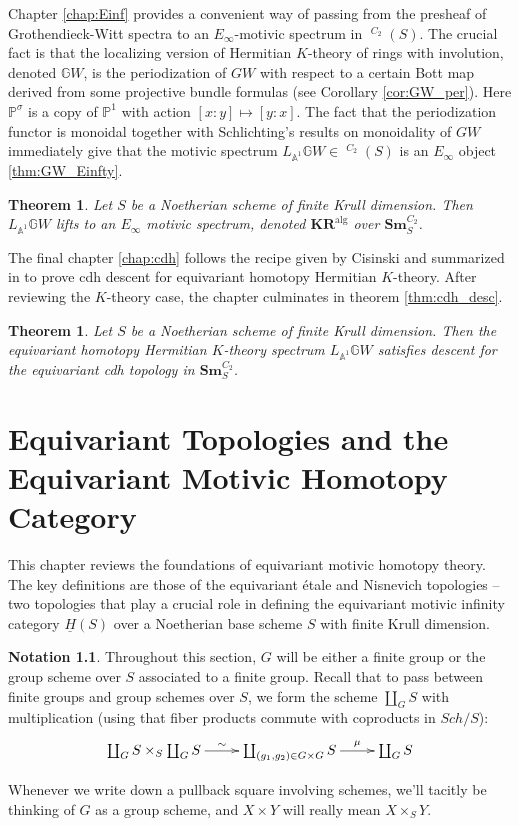 \documentclass[edeposit,fullpage]{uiucthesis2009}
\newcommand{\mbb}{\mathbb}
\newcommand{\Sm}[1]{\mathbf{Sm}_{#1}}
\newcommand{\KR}{\mathbf{KR}^{\mathrm{alg}}}
\DeclareMathOperator{\SH}{\underline{SH}}
\theoremstyle{plain}
\numberwithin{lemma}{section}
\newtheorem{theorem}[lemma]{Theorem}
\theoremstyle{definition}
\newtheorem{notation}[lemma]{Notation}
\begin{document}
Chapter \ref{chap:Einf} provides a convenient way of passing from the
presheaf of Grothendieck-Witt spectra to an
$E_\infty$-motivic spectrum in $\SH^{C_2}(S)$. The crucial fact is that
the localizing version of Hermitian $K$-theory of rings with involution, denoted $\mbb
GW$, is the periodization of $GW$ with respect to a certain Bott map
derived from some projective bundle formulas (see Corollary \ref{cor:GW_per}). Here
$\mbb P^\sigma$ is a copy of $\mbb P^1$ with action $[x:y] \mapsto
[y:x]$. The fact that the periodization functor is monoidal together
with Schlichting's results on monoidality of $GW$ immediately give
that the motivic spectrum $L_{\mbb A^1}\mbb GW \in \SH^{C_2}(S)$ is an
$E_\infty$ object \ref{thm:GW_Einfty}.

\begin{theorem}
Let $S$ be a Noetherian scheme of finite Krull dimension. Then $L_{\mbb A^1}\mbb GW$ lifts to an $E_\infty$ motivic spectrum, denoted
$\KR$ over $\Sm{S}^{C_2}$.
\end{theorem}

The final chapter \ref{chap:cdh} follows the recipe given by Cisinski
and summarized in \cite{cdhdesc} to prove cdh descent for equivariant
homotopy Hermitian $K$-theory. After reviewing the $K$-theory case,
the chapter culminates in theorem \ref{thm:cdh_desc}.

\begin{theorem}
Let $S$ be a Noetherian scheme of finite Krull dimension. Then the
equivariant homotopy Hermitian $K$-theory spectrum $L_{\mbb A^1}\mbb
GW$ satisfies descent for the equivariant cdh topology in $\Sm{S}^{C_2}$.
\end{theorem}

\chapter{Equivariant Topologies and the Equivariant Motivic Homotopy Category}\label{chap:Eq_Top}

This chapter reviews the foundations of equivariant motivic homotopy
theory. The key definitions are those of the equivariant \'etale and
Nisnevich topologies -- two topologies that play a crucial role in
defining the equivariant motivic infinity category
$\underline{H}(S)$ over a Noetherian base scheme $S$ with finite Krull dimension.

\begin{notation}
Throughout this section, $G$ will be either a finite group or the
group scheme over $S$ associated to a finite group. Recall that to pass between
finite groups and group schemes over $S$, we form the scheme
$\coprod_G S$ with multiplication (using that fiber products commute
with coproducts in $Sch/S$):
\[
\xymatrix{\coprod_G S \times_S \coprod_G S \ar[r]^-\sim &\coprod_{(g_1,g_2)\in G \times
  G} S \ar[r]^-{\mu}& \coprod_G S}
\]

Whenever we write down a pullback square involving schemes, we'll
tacitly be thinking of $G$ as a group scheme, and $X \times Y$ will
really mean $X \times_S Y$.
\end{notation}
\end{document}
